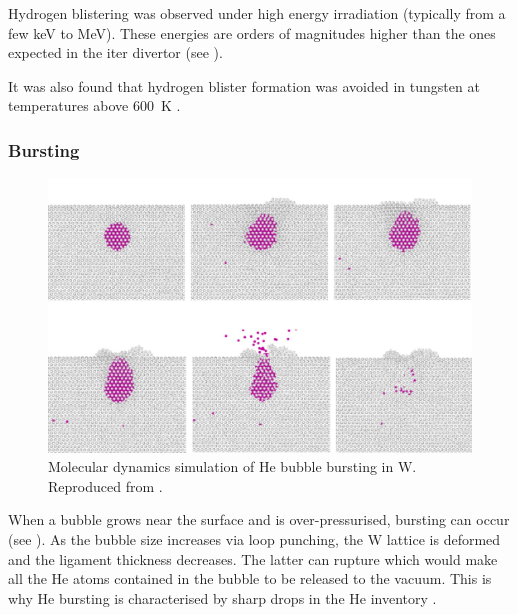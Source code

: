 Hydrogen \gls{blistering} was observed under high energy irradiation (typically from a few \si{keV} to \si{MeV}).
These energies are orders of magnitudes higher than the ones expected in the \acrshort{iter} \gls{divertor} (see ).

It was also found that hydrogen blister formation was avoided in tungsten at temperatures above \SI{600}{K} .

\subsubsection{Bursting}

\begin{figure} [h!]
    \centering
    \includegraphics[width=\linewidth]{Figures/Chapter1/bubble_bursting_zhou.jpg}
    \caption{Molecular dynamics simulation of He bubble bursting in W. Reproduced from \cite{zhou_growth_2019}.}
\end{figure}

When a bubble grows near the surface and is over-pressurised, \gls{bursting} can occur (see ).
As the bubble size increases via \gls{loop punching}, the W \gls{lattice} is deformed and the ligament thickness decreases.
The latter can rupture which would make all the He atoms contained in the bubble to be released to the vacuum.
This is why He \gls{bursting} is characterised by sharp drops in the He \gls{inventory} .

